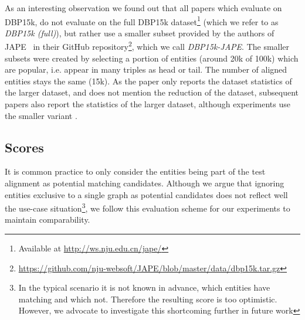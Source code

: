 \documentclass[runningheads]{llncs}
\begin{document}
As an interesting observation we found out that all papers which evaluate on DBP15k, do not evaluate on the full DBP15k dataset\footnote{Available at \url{http://ws.nju.edu.cn/jape/}} (which we refer to as \emph{DBP15k (full)}), but rather use a smaller subset provided by the authors of JAPE~\cite{DBLP:conf/semweb/SunHL17} in their GitHub repository\footnote{\url{https://github.com/nju-websoft/JAPE/blob/master/data/dbp15k.tar.gz}}, which we call \emph{DBP15k-JAPE}.
The smaller subsets were created by selecting a portion of entities (around 20k of 100k) which are popular, i.e. appear in many triples as head or tail.
The number of aligned entities stays the same (15k).
As the paper only reports the dataset statistics of the larger dataset, and does not mention the reduction of the dataset, subsequent papers
also report the statistics of the larger dataset, although experiments use the smaller variant \cite{DBLP:conf/semweb/SunHL17,sun2018bootstrapping,DBLP:conf/emnlp/WangLLZ18,DBLP:conf/acl/CaoLLLLC19,DBLP:conf/ijcai/ZhuXLS17}.

\subsection{Scores}
It is common practice to only consider the entities being part of the test alignment as potential matching candidates.
Although we argue that ignoring entities exclusive to a single graph as potential candidates does not reflect well the use-case situation\footnote{In the typical scenario it is not known in advance, which entities have matching and which not. Therefore the resulting score is too optimistic. However, we advocate to investigate this shortcoming further in future work}, we follow this evaluation scheme for our experiments to maintain comparability.
\end{document}
